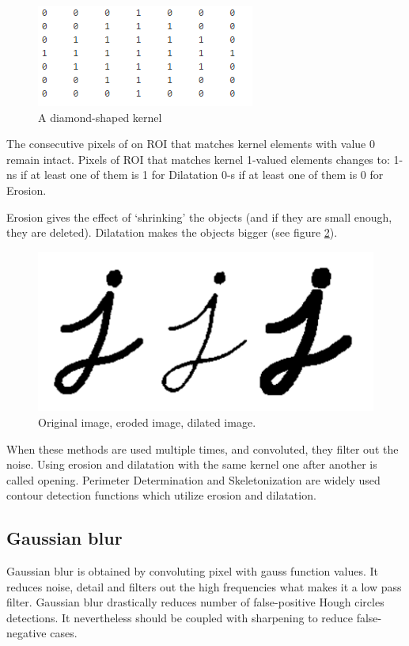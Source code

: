 \documentclass[12pt,twoside,a4paper]{article}
\begin{document}
 
\begin{figure}[H]
\centering
\includegraphics[width=0.4\paperwidth]{diam}
\caption{A diamond-shaped kernel\cite{morph}}\label{fig:diam}
\end{figure}

The consecutive pixels of on ROI that matches kernel elements with value 0 remain intact.
Pixels of ROI that matches kernel 1-valued elements changes to:
1-ns if at least one of them is 1 for Dilatation
0-s if at least one of them is 0 for Erosion.

Erosion gives the effect of ‘shrinking’ the objects (and if they are small enough, they are deleted).
Dilatation makes the objects bigger (see figure \ref{fig:lett}).

 
\begin{figure}[H]
\centering
\includegraphics[width=0.4\paperwidth]{lett}
\caption{Original image, eroded image, dilated image.\cite{erdil}}\label{fig:lett}
\end{figure}


When these methods are used multiple times, and convoluted, they filter out the noise.
Using erosion and dilatation with the same kernel one after another is called opening.
Perimeter Determination and Skeletonization are widely used contour detection functions which utilize erosion and dilatation\cite{erdil}.


\subsection{Gaussian blur}

Gaussian blur is obtained by convoluting pixel with gauss function values. 
It reduces noise, detail and filters out the high frequencies what makes it a low pass filter.\cite{cv}
Gaussian blur drastically reduces number of false-positive Hough circles detections. It nevertheless should be coupled with sharpening to reduce false-negative cases.\cite{cnoisy} 
\end{document}
